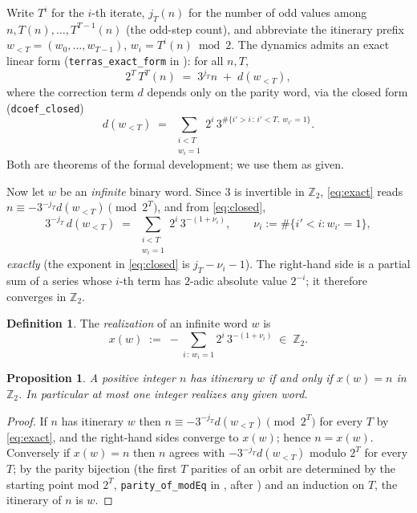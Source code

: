 \documentclass[11pt]{article}
\newtheorem{proposition}[theorem]{Proposition}
\theoremstyle{definition}
\newtheorem{definition}[theorem]{Definition}
\newcommand{\Z}{\mathbb{Z}}
\newcommand{\Ztwo}{\Z_2}
\newcommand{\code}[1]{\texttt{#1}}
\begin{document}
Write $T^{i}$ for the $i$-th iterate, $j_T(n)$ for the number of odd
values among $n, T(n), \ldots, T^{T-1}(n)$ (the odd-step count), and
abbreviate the itinerary prefix $w_{<T} = (w_0, \ldots, w_{T-1})$,
$w_i = T^i(n) \bmod 2$. The dynamics admits an exact linear form
(\code{terras\_exact\_form} in \cite{companion}): for all $n, T$,
\begin{equation}\label{eq:exact}
2^T \, T^{T}(n) \;=\; 3^{j_T} n \;+\; d(w_{<T}),
\end{equation}
where the correction term $d$ depends only on the parity word, via
the closed form (\code{dcoef\_closed})
\begin{equation}\label{eq:closed}
d(w_{<T}) \;=\; \sum_{\substack{i < T \\ w_i = 1}}
  2^{i}\, 3^{\#\{i' > i \,:\, i' < T,\ w_{i'} = 1\}}.
\end{equation}
Both are theorems of the formal development; we use them as given.

Now let $w$ be an \emph{infinite} binary word. Since $3$ is invertible
in $\Ztwo$, \eqref{eq:exact} reads $n \equiv -3^{-j_T} d(w_{<T})
\pmod{2^T}$, and from \eqref{eq:closed},
\[
3^{-j_T}\, d(w_{<T}) \;=\; \sum_{\substack{i < T \\ w_i = 1}}
2^{i}\, 3^{-(1 + \nu_i)}, \qquad
\nu_i := \#\{i' < i : w_{i'} = 1\},
\]
\emph{exactly} (the exponent in \eqref{eq:closed} is
$j_T - \nu_i - 1$). The right-hand side is a partial sum of a series
whose $i$-th term has $2$-adic absolute value $2^{-i}$; it therefore
converges in $\Ztwo$.

\begin{definition}\label{def:realization}
The \emph{realization} of an infinite word $w$ is
\[
x(w) \;:=\; -\sum_{i \,:\, w_i = 1} 2^{i}\, 3^{-(1+\nu_i)}
\;\in\; \Ztwo .
\]
\end{definition}

\begin{proposition}\label{prop:realization}
A positive integer $n$ has itinerary $w$ if and only if $x(w) = n$
in $\Ztwo$. In particular at most one integer realizes any given word.
\end{proposition}

\begin{proof}
If $n$ has itinerary $w$ then $n \equiv -3^{-j_T}d(w_{<T}) \pmod{2^T}$
for every $T$ by \eqref{eq:exact}, and the right-hand sides converge
to $x(w)$; hence $n = x(w)$. Conversely if $x(w) = n$ then $n$ agrees
with $-3^{-j_T} d(w_{<T})$ modulo $2^T$ for every $T$; by the parity
bijection (the first $T$ parities of an orbit are determined by the
starting point mod $2^T$, \code{parity\_of\_modEq} in
\cite{companion}, after \cite{terras}) and an induction on $T$, the
itinerary of $n$ is $w$.
\end{proof}
\end{document}
